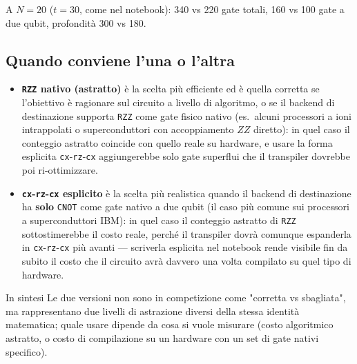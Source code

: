 \documentclass[11pt,a4paper]{article}
\begin{document}
A $N=20$ ($t=30$, come nel notebook): 340 vs 220 gate totali, 160 vs
100 gate a due qubit, profondità 300 vs 180.

\subsection*{Quando conviene l'una o l'altra}

\begin{itemize}[leftmargin=1.3em,itemsep=0.3em]
\item \textbf{\texttt{RZZ} nativo (astratto)} è la scelta più efficiente
ed è quella corretta se l'obiettivo è ragionare sul circuito a livello
di algoritmo, o se il backend di destinazione supporta \texttt{RZZ}
come gate fisico nativo (es.\ alcuni processori a ioni intrappolati o
superconduttori con accoppiamento $ZZ$ diretto): in quel caso il
conteggio astratto coincide con quello reale su hardware, e usare la
forma esplicita \texttt{cx}-\texttt{rz}-\texttt{cx} aggiungerebbe solo
gate superflui che il transpiler dovrebbe poi ri-ottimizzare.
\item \textbf{\texttt{cx}-\texttt{rz}-\texttt{cx} esplicito} è la
scelta più realistica quando il backend di destinazione ha
\textbf{solo} \texttt{CNOT} come gate nativo a due qubit (il caso più
comune sui processori a superconduttori IBM): in quel caso il
conteggio astratto di \texttt{RZZ} sottostimerebbe il costo reale,
perché il transpiler dovrà comunque espanderla in
\texttt{cx}-\texttt{rz}-\texttt{cx} più avanti --- scriverla esplicita
nel notebook rende visibile fin da subito il costo che il circuito
avrà davvero una volta compilato su quel tipo di hardware.
\end{itemize}

\begin{okbox}{In sintesi}
Le due versioni non sono in competizione come "corretta vs sbagliata",
ma rappresentano due livelli di astrazione diversi della stessa
identità matematica; quale usare dipende da cosa si vuole misurare
(costo algoritmico astratto, o costo di compilazione su un hardware
con un set di gate nativi specifico).
\end{okbox}
\end{document}
